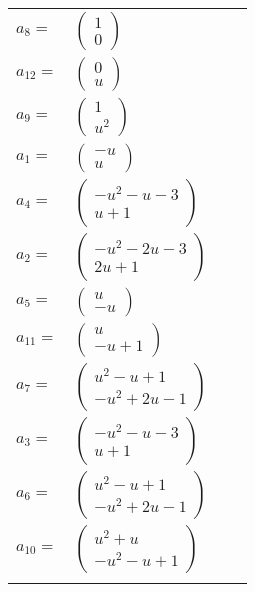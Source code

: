 \documentclass[1p]{elsarticle_modified}
\theoremstyle{definition}
\begin{document}
\begin{tabular}{m{7pt} m{180pt} m{7pt} m{180pt} }
\flushright $a_{8}=$&$\begin{pmatrix}1\\0\end{pmatrix}$ \\
\flushright $a_{12}=$&$\begin{pmatrix}0\\u\end{pmatrix}$ \\
\flushright $a_{9}=$&$\begin{pmatrix}1\\u^2\end{pmatrix}$ \\
\flushright $a_{1}=$&$\begin{pmatrix}- u\\u\end{pmatrix}$ \\
\flushright $a_{4}=$&$\begin{pmatrix}- u^2- u-3\\u+1\end{pmatrix}$ \\
\flushright $a_{2}=$&$\begin{pmatrix}- u^2-2 u-3\\2 u+1\end{pmatrix}$ \\
\flushright $a_{5}=$&$\begin{pmatrix}u\\- u\end{pmatrix}$ \\
\flushright $a_{11}=$&$\begin{pmatrix}u\\- u+1\end{pmatrix}$ \\
\flushright $a_{7}=$&$\begin{pmatrix}u^2- u+1\\- u^2+2 u-1\end{pmatrix}$ \\
\flushright $a_{3}=$&$\begin{pmatrix}- u^2- u-3\\u+1\end{pmatrix}$ \\
\flushright $a_{6}=$&$\begin{pmatrix}u^2- u+1\\- u^2+2 u-1\end{pmatrix}$ \\
\flushright $a_{10}=$&$\begin{pmatrix}u^2+u\\- u^2- u+1\end{pmatrix}$\\&\end{tabular}
\end{document}
